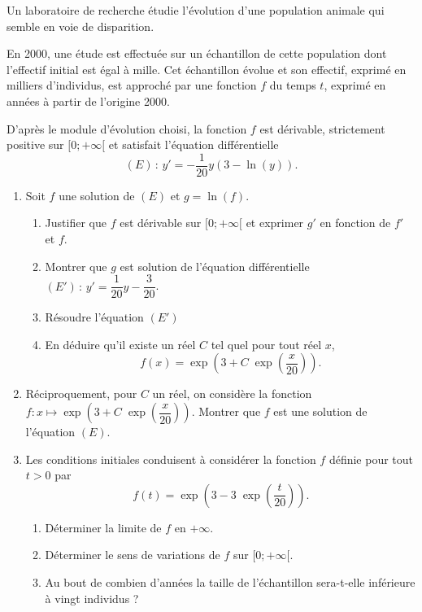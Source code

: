 \documentclass[11pt,fleqn, openany]{book} %
\begin{document}
\begin{exercise}[subtitle={(Modèle de Gompertz)}]Un laboratoire de recherche étudie l'évolution d'une population animale qui semble en voie de disparition.

En 2000, une étude est effectuée sur un échantillon de cette population dont l'effectif initial est égal à mille. Cet échantillon évolue et son effectif, exprimé en milliers d'individus, est approché par une fonction $f$ du temps $t$, exprimé en années à partir de l'origine 2000.

D'après le module d'évolution choisi, la fonction $f$ est dérivable, strictement positive sur $[0;+\infty[$ et satisfait l'équation différentielle
\[(E)\,:\,y'=-\dfrac{1}{20}y(3-\ln(y)).\]

\begin{enumerate}
\item Soit $f$ une solution de $(E)$ et $g=\ln(f)$.
\begin{enumerate}
\item Justifier que $f$ est dérivable sur $[0;+\infty[$ et exprimer $g'$ en fonction de $f'$ et $f$.
\item Montrer que $g$ est solution de l'équation différentielle $(E')\,:\,y'=\dfrac{1}{20}y-\dfrac{3}{20}$.
\item Résoudre l'équation $(E')$
\item En déduire qu'il existe un réel $C$ tel quel pour tout réel $x$, 
\[f(x)=\exp\left(3+C\;\exp\left(\dfrac{x}{20}\right)\right).\]
\end{enumerate}
\item Réciproquement, pour $C$ un réel, on considère la fonction $f:x\mapsto \exp\left(3+C\;\exp\left(\dfrac{x}{20}\right)\right)$. Montrer que $f$ est une solution de l'équation $(E)$.
\item Les conditions initiales conduisent à considérer la fonction $f$ définie pour tout $t>0$ par
\[f(t)= \exp\left(3-3\;\exp\left(\dfrac{t}{20}\right)\right).\]

\begin{enumerate}
\item Déterminer la limite de $f$ en $+\infty$.
\item Déterminer le sens de variations de $f$ sur $[0;+\infty[$.
\item Au bout de combien d'années la taille de l'échantillon sera-t-elle inférieure à vingt individus ?
\end{enumerate}
\end{enumerate}\end{exercise}
\end{document}
